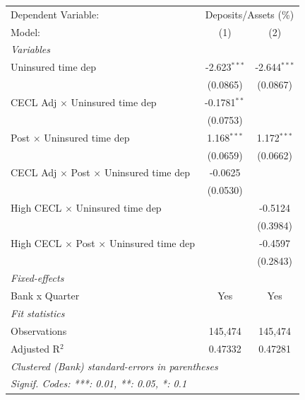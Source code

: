 
\begingroup
\centering
\begin{tabular}{lcc}
   \tabularnewline \midrule \midrule
   Dependent Variable: & \multicolumn{2}{c}{Deposits/Assets (\%)}\\
   Model:                                                & (1)            & (2)\\  
   \midrule
   \emph{Variables}\\
   Uninsured time dep                                    & -2.623$^{***}$ & -2.644$^{***}$\\   
                                                         & (0.0865)       & (0.0867)\\   
   CECL Adj $\times$ Uninsured time dep                  & -0.1781$^{**}$ &   \\   
                                                         & (0.0753)       &   \\   
   Post $\times$ Uninsured time dep                      & 1.168$^{***}$  & 1.172$^{***}$\\   
                                                         & (0.0659)       & (0.0662)\\   
   CECL Adj $\times$ Post $\times$ Uninsured time dep    & -0.0625        &   \\   
                                                         & (0.0530)       &   \\   
   High CECL $\times$ Uninsured time dep                 &                & -0.5124\\   
                                                         &                & (0.3984)\\   
   High CECL $\times$ Post $\times$ Uninsured time dep   &                & -0.4597\\   
                                                         &                & (0.2843)\\   
   \midrule
   \emph{Fixed-effects}\\
   Bank x Quarter                                        & Yes            & Yes\\  
   \midrule
   \emph{Fit statistics}\\
   Observations                                          & 145,474        & 145,474\\  
   Adjusted R$^2$                                        & 0.47332        & 0.47281\\  
   \midrule \midrule
   \multicolumn{3}{l}{\emph{Clustered (Bank) standard-errors in parentheses}}\\
   \multicolumn{3}{l}{\emph{Signif. Codes: ***: 0.01, **: 0.05, *: 0.1}}\\
\end{tabular}
\par\endgroup


